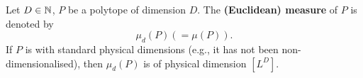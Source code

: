 \begin{notation}
  Let $D \in \mathbb{N}$,
  $P$ be a polytope of dimension $D$.
  The \textbf{(Euclidean) measure} of $P$ is denoted by
  \begin{equation}
    \mu_d(P) (= \mu(P)).
  \end{equation}
  If $P$ is with standard physical dimensions
  (e.g., it has not been non-dimensionalised),
  then $\mu_d(P)$ is of physical dimension $[L^D]$.
\end{notation}
